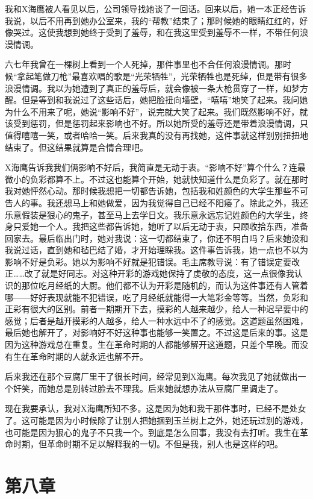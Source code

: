 我和X海鹰被人看见以后，公司领导找她谈了一回话。回来以后，她一本正经告诉我说，以后不用再到她办公室来，我的“帮教”结束了；那时候她的眼睛红红的，好像哭过。这使我想到她终于受到了羞辱，和在我这里受到羞辱不一样，不带任何浪漫情调。 

六七年我曾在一棵树上看到一个人死掉，那件事里也不合任何浪漫情调。那时候“拿起笔做刀枪”最喜欢唱的歌是“光荣牺牲”，光荣牺牲也是死绰，但是带有很多浪漫情调。我以为她遭到了真正的羞辱后，就会像被一条大枪贯穿了一样，如梦方醒。但是等到和我说过了这些话后，她把脸扭向墙壁，“嘻嘻”地笑了起来。我问她为什么不用来了呢，她说“影响不好”，说完就大笑了起来。我们既然影响不好，就该受到惩罚，但是惩罚起来影响也不好。所以她所受的羞辱还是带着浪漫情调，只值得嘻嘻一笑，或者哈哈一笑。后来我真的没有再找她，这件事就这样别别扭扭地结束了。但这结果就算是合情合理吧。 

X海鹰告诉我我们俩影响不好后，我简直是无动于衷。“影响不好”算个什么？连最微小的负彩都算不上。不过这也能算个开始，她就快知道什么是负彩了。就在那时我对她怦然心动。那时候我想把一切都告诉她，包括我和姓颜色的大学生那些不可告人的事。我还想马上和她做爱，因为我觉得自己已经不阳痿了。除此之外，我还乐意假装是狠心的鬼子，甚至马上去学日文。我乐意永远忘记姓颜色的大学生，终身只爱她一个人。我把这些都告诉她，她听了以后无动于衷，只顾收拾东西，准备回家去。最后临出门时，她对我说：这一切都结束了，你还不明白吗？后来她没和我说过话，直到她和毡巴结了婚，才开始理睬我。这件事告诉我，她一点也不以为影响不好是负彩。她以为影响不好就是犯错误。毛主席教导说：有了错误定要改正……改了就是好同志。对这种开彩的游戏她保持了虔敬的态度，这一点很像我认识的那位吃月经纸的大厨。他们都不认为开彩是随机的，而认为这件事还有人管着哪——好好表现就能不犯错误，吃了月经纸就能得一大笔彩金等等。当然，负彩和正彩有很大的区别。前者一期期开下去，摸彩的人越来越少，给人一种迟早要中的感觉；后者是越开摸彩的人越多，给人一种水远中不了的感觉。这道题虽然困难，最后她也解开了，对影响好不好这种事也能够一笑置之。不过这是后来的事。这是因为这种游戏总在重复。生在革命时期的人都能够解开这道题，只差个早晚。而没有生在革命时期的人就永远也解不开。 

后来我还在那个豆腐厂里干了很长时间，经常见到X海鹰。每次我见了她就做出一个奸笑，而她总是别转过脸去不理我。后来她就想办法从豆腐厂里调走了。 

现在我要承认，我对X海鹰所知不多。这是因为她和我干那件事时，已经不是处女了。这可能是因为小时候除了让别人把她捆到玉兰树上之外，她还玩过别的游戏，也可能是因为狠心的鬼子不只我一个。到底是怎么回事，我没有去打听。我生在革命时期，但革命时期不足以解释我的一切。不但是我，别人也是这样的吧。

\section{第八章}

